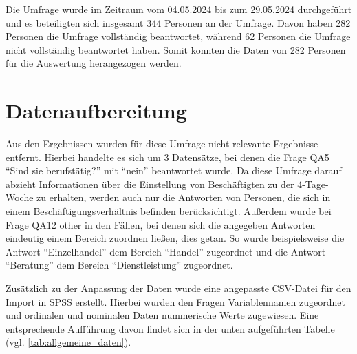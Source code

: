 Die Umfrage wurde im Zeitraum vom 04.05.2024 bis zum 29.05.2024 durchgeführt und es beteiligten sich
insgesamt 344 Personen an der Umfrage. Davon haben 282 Personen die Umfrage vollständig beantwortet,
während 62 Personen die Umfrage nicht vollständig beantwortet haben. Somit konnten die Daten von 282 Personen für die Auswertung herangezogen werden.

\section{Datenaufbereitung}
Aus den Ergebnissen wurden für diese Umfrage nicht relevante Ergebnisse entfernt. 
Hierbei handelte es sich um 3 Datensätze, bei denen die Frage QA5 “Sind sie berufstätig?” 
mit “nein” beantwortet wurde. Da diese Umfrage darauf abzieht Informationen über die 
Einstellung von Beschäftigten zu der 4-Tage-Woche zu erhalten, werden auch nur die 
Antworten von Personen, die sich in einem Beschäftigungsverhältnis befinden berücksichtigt. 
Außerdem wurde bei Frage QA12 other in den Fällen, bei denen sich die angegeben Antworten 
eindeutig einem Bereich zuordnen ließen, dies getan. So wurde beispielsweise die Antwort 
“Einzelhandel” dem Bereich “Handel” zugeordnet und die Antwort “Beratung” dem Bereich 
“Dienstleistung” zugeordnet.

Zusätzlich zu der Anpassung der Daten wurde eine angepasste CSV-Datei für den Import 
in \ac{SPSS} \parencite[vgl.][]{ibm_spss_nodate} erstellt. Hierbei wurden den Fragen Variablennamen zugeordnet und ordinalen 
und nominalen Daten nummerische Werte zugewiesen. Eine entsprechende Aufführung davon 
findet sich in der unten aufgeführten Tabelle (vgl. \ref{tab:allgemeine_daten}). 